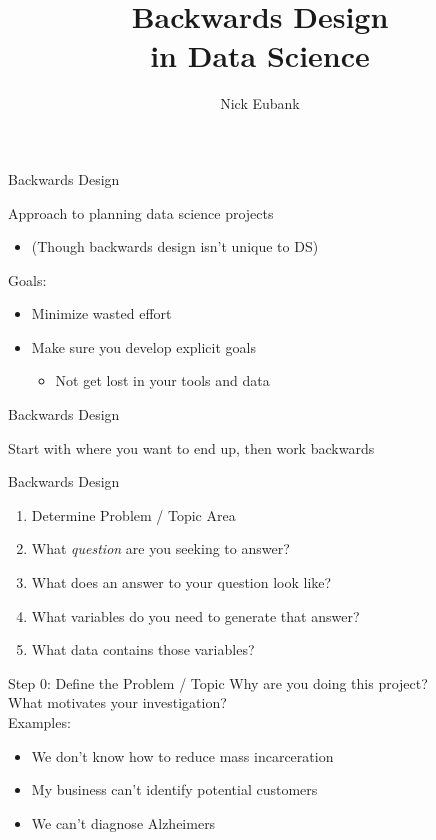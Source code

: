\documentclass[11pt]{beamer}
\title{Backwards Design \\ in Data Science}
\author{\small Nick Eubank}
\date{\vspace*{.3in} \date}
\begin{document}
\begin{frame}
\maketitle
\end{frame}

\begin{frame}[c]{Backwards Design}

Approach to planning data science projects
  \begin{itemize}
    \pause \item (Though backwards design isn't unique to DS)
  \end{itemize}
Goals:
\begin{itemize}
  \item Minimize wasted effort
  \pause \item Make sure you develop explicit goals
  \begin{itemize}
    \item Not get lost in your tools and data
  \end{itemize}
\end{itemize}
\end{frame}

\begin{frame}[c]{Backwards Design}

  Start with where you want to end up, then work backwards

\end{frame}

\begin{frame}[c]{Backwards Design}
  \begin{enumerate}
    \pause \item Determine Problem / Topic Area
    \pause \item What \emph{question} are you seeking to answer?
    \pause \item What does an answer to your question look like?
    \pause \item What variables do you need to generate that answer?
    \pause \item What data contains those variables?
  \end{enumerate}
\end{frame}

\begin{frame}[c]{Step 0: Define the \alert{Problem / Topic}}
Why are you doing this project? \\
\pause What \alert{motivates} your investigation?\\
\vspace*{0.1cm}
\pause Examples:
\begin{itemize}
  \item We don't know how to reduce mass incarceration
  \item My business can't identify potential customers
  \item We can't diagnose Alzheimers
\end{itemize}
\end{frame}
\end{document}
